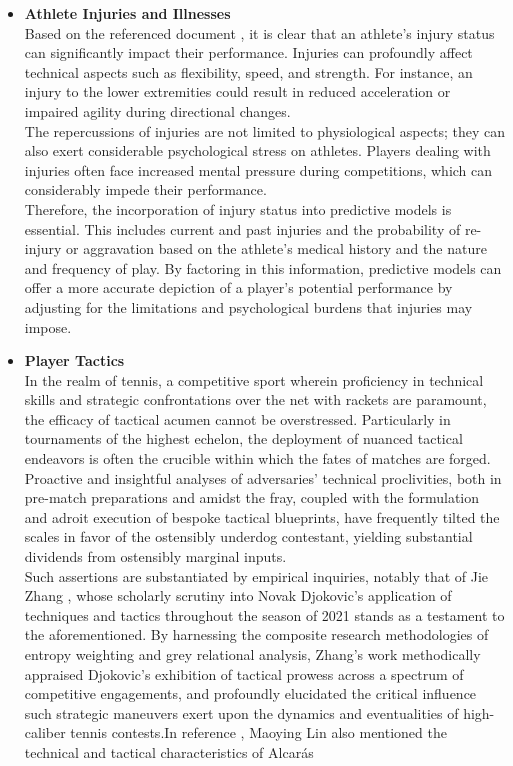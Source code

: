 \begin{itemize}
    
    \item  \textbf{Athlete Injuries and Illnesses}\\
    Based on the referenced document \cite{ref4}, it is clear that an athlete's injury status can significantly impact their performance. Injuries can profoundly affect technical aspects such as flexibility, speed, and strength. For instance, an injury to the lower extremities could result in reduced acceleration or impaired agility during directional changes. \\
    The repercussions of injuries are not limited to physiological aspects; they can also exert considerable psychological stress on athletes. Players dealing with injuries often face increased mental pressure during competitions, which can considerably impede their performance. \\
    Therefore, the incorporation of injury status into predictive models is essential. This includes current and past injuries and the probability of re-injury or aggravation based on the athlete's medical history and the nature and frequency of play. By factoring in this information, predictive models can offer a more accurate depiction of a player's potential performance by adjusting for the limitations and psychological burdens that injuries may impose.
    \item \textbf{Player Tactics}\\
    In the realm of tennis, a competitive sport wherein proficiency in technical skills and strategic confrontations over the net with rackets are paramount, the efficacy of tactical acumen cannot be overstressed. Particularly in tournaments of the highest echelon, the deployment of nuanced tactical endeavors is often the crucible within which the fates of matches are forged. Proactive and insightful analyses of adversaries' technical proclivities, both in pre-match preparations and amidst the fray, coupled with the formulation and adroit execution of bespoke tactical blueprints, have frequently tilted the scales in favor of the ostensibly underdog contestant, yielding substantial dividends from ostensibly marginal inputs.\\
    Such assertions are substantiated by empirical inquiries, notably that of Jie Zhang \cite{ref5}, whose scholarly scrutiny into Novak Djokovic's application of techniques and tactics throughout the season of 2021 stands as a testament to the aforementioned. By harnessing the composite research methodologies of entropy weighting and grey relational analysis, Zhang's work methodically appraised Djokovic's exhibition of tactical prowess across a spectrum of competitive engagements, and profoundly elucidated the critical influence such strategic maneuvers exert upon the dynamics and eventualities of high-caliber tennis contests.In reference \cite{ref6}, Maoying Lin also mentioned the technical and tactical characteristics of Alcarás
\end{itemize}

